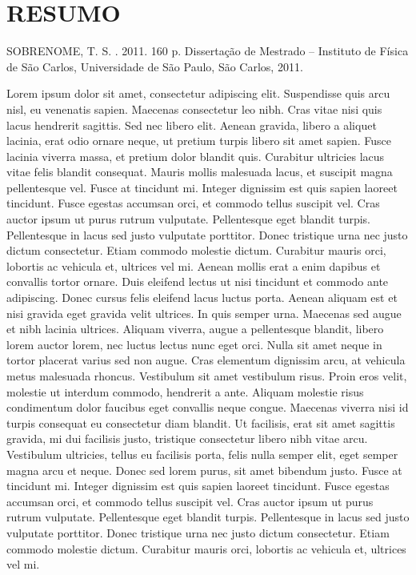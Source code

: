 \chapter*{RESUMO}

\begin{citacaotese}
  SOBRENOME, T. S. \textit{\ABNTtitulodata}. 2011. 160
  p. Disserta\c{c}\~ao de Mestrado -- Instituto de F\'isica de S\~ao
  Carlos, Universidade de S\~ao Paulo, S\~ao Carlos, 2011.
\end{citacaotese}

\begin{resumo}
  Lorem ipsum dolor sit amet, consectetur adipiscing elit. Suspendisse
  quis arcu nisl, eu venenatis sapien. Maecenas consectetur leo
  nibh. Cras vitae nisi quis lacus hendrerit sagittis. Sed nec libero
  elit. Aenean gravida, libero a aliquet lacinia, erat odio ornare
  neque, ut pretium turpis libero sit amet sapien. Fusce lacinia
  viverra massa, et pretium dolor blandit quis. Curabitur ultricies
  lacus vitae felis blandit consequat. Mauris mollis malesuada lacus,
  et suscipit magna pellentesque vel. Fusce at tincidunt mi. Integer
  dignissim est quis sapien laoreet tincidunt. Fusce egestas accumsan
  orci, et commodo tellus suscipit vel. Cras auctor ipsum ut purus
  rutrum vulputate. Pellentesque eget blandit turpis. Pellentesque in
  lacus sed justo vulputate porttitor. Donec tristique urna nec justo
  dictum consectetur. Etiam commodo molestie dictum. Curabitur mauris
  orci, lobortis ac vehicula et, ultrices vel mi. Aenean mollis erat a
  enim dapibus et convallis tortor ornare. Duis eleifend lectus ut
  nisi tincidunt et commodo ante adipiscing. Donec cursus felis
  eleifend lacus luctus porta. Aenean aliquam est et nisi gravida eget
  gravida velit ultrices. In quis semper urna. Maecenas sed augue et
  nibh lacinia ultrices. Aliquam viverra, augue a pellentesque
  blandit, libero lorem auctor lorem, nec luctus lectus nunc eget
  orci. Nulla sit amet neque in tortor placerat varius sed non
  augue. Cras elementum dignissim arcu, at vehicula metus malesuada
  rhoncus. Vestibulum sit amet vestibulum risus. Proin eros velit,
  molestie ut interdum commodo, hendrerit a ante. Aliquam molestie
  risus condimentum dolor faucibus eget convallis neque
  congue. Maecenas viverra nisi id turpis consequat eu consectetur
  diam blandit. Ut facilisis, erat sit amet sagittis gravida, mi dui
  facilisis justo, tristique consectetur libero nibh vitae
  arcu. Vestibulum ultricies, tellus eu facilisis porta, felis nulla
  semper elit, eget semper magna arcu et neque. Donec sed lorem purus,
  sit amet bibendum justo. Fusce at tincidunt mi. Integer dignissim
  est quis sapien laoreet tincidunt. Fusce egestas accumsan orci, et
  commodo tellus suscipit vel. Cras auctor ipsum ut purus rutrum
  vulputate. Pellentesque eget blandit turpis. Pellentesque in lacus
  sed justo vulputate porttitor. Donec tristique urna nec justo dictum
  consectetur. Etiam commodo molestie dictum. Curabitur mauris orci,
  lobortis ac vehicula et, ultrices vel mi.
\end{resumo}

